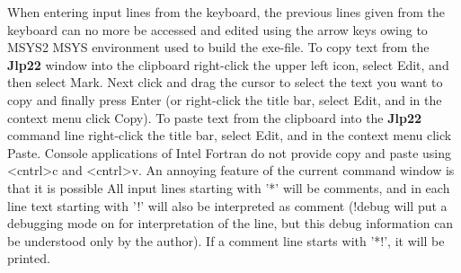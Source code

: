 When entering input lines from the keyboard, the previous lines given from the keyboard can no more be 
accessed and edited using the arrow keys owing to MSYS2 MSYS environment used to build the exe-file. 
To copy text from the \textbf{Jlp22} window into the clipboard right-click the upper left icon, select Edit, 
and then select Mark. Next click and drag the cursor to select the text you want to copy and 
finally press Enter (or right-click the title bar, select Edit, and in the context menu click Copy). 
To paste text from the clipboard into the \textbf{Jlp22} command line right-click the title bar, select Edit, 
and in the context menu click Paste. Console applications of Intel Fortran do not provide copy 
and paste using <cntrl>c and <cntrl>v. An annoying feature of the current command window is that it is possible 
All input lines starting with '*' will be comments, and in each line text starting with '!' will also 
be interpreted as comment (!debug will put a debugging mode on for interpretation of the 
line, but this debug information can be understood only by the author). If a comment line starts 
with '*!', it will be printed. 
